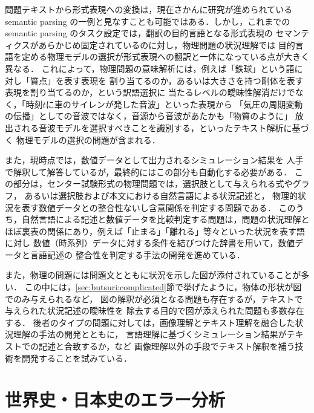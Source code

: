 \documentclass[japanese]{jnlp_1.4b}
\begin{document}
  問題テキストから形式表現への変換は，現在さかんに研究が進められている
  semantic parsing の一例と見なすことも可能ではある．しかし，これまでの
  semantic parsing のタスク設定では，翻訳の目的言語となる形式表現の
  セマンティクスがあらかじめ固定されているのに対し，物理問題の状況理解では
  目的言語を定める物理モデルの選択が形式表現への翻訳と一体になっている点が大きく異なる．
  これによって，物理問題の意味解析には，例えば「鉄球」という語に対し「質点」を表す表現を
  割り当てるのか，あるいは大きさを持つ剛体を表す表現を割り当てるのか，という訳語選択に
  当たるレベルの曖昧性解消だけでなく，「時刻$t$に車のサイレンが発した音波」といった表現から
  「気圧の周期変動の伝播」としての音波ではなく，音源から音波があたかも「物質のように」
  放出される音波モデルを選択すべきことを識別する，といったテキスト解析に基づく
  物理モデルの選択の問題が含まれる．

  また，現時点では，数値データとして出力されるシミュレーション結果を
  人手で解釈して解答しているが，最終的にはこの部分も自動化する必要がある．
  この部分は，センター試験形式の物理問題では，選択肢として与えられる式やグラフ，
  あるいは選択肢および本文における自然言語による状況記述と，
  物理的状況を表す数値データとの整合性ないし含意関係を判定する問題である．
  このうち，自然言語による記述と数値データを比較判定する問題は，問題の状況理解と
  ほぼ裏表の関係にあり，例えば「止まる」「離れる」等々といった状況を表す語に対し
  数値（時系列）データに対する条件を結びつけた辞書を用いて，数値データと言語記述の
  整合性を判定する手法の開発を進めている\cite{YokonoNLP2013}．

  また，物理の問題には問題文とともに状況を示した図が添付されていることが多い．
  この中には，\ref{sec:butsuri:complicated}節で挙げたように，物体の形状が図でのみ与えられるなど，
  図の解釈が必須となる問題も存在するが，テキストで与えられた状況記述の曖昧性を
  除去する目的で図が添えられた問題も多数存在する．
  後者のタイプの問題に対しては，画像理解とテキスト理解を融合した状況理解の手法の開発とともに，
  言語理解に基づくシミュレーション結果がテキストでの記述と合致するか，など
  画像理解以外の手段でテキスト解釈を補う技術を開発することを試みている．



\section{世界史・日本史のエラー分析}
\end{document}
